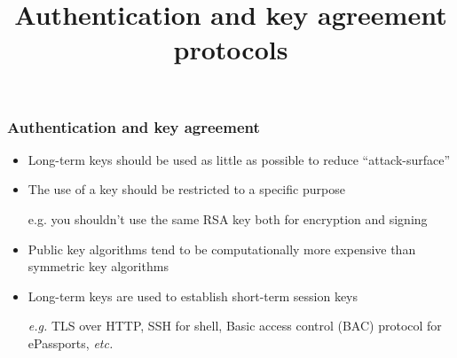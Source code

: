 \documentclass[aspectratio=169, lualatex,  10pt,dvipsnames,svgnames]{beamer} %
\def\envert#1{\textcolor{vert}{#1}}
\def\enrouge#1{\textcolor{rouge}{#1}}
\begin{document}
\fi

\title{Authentication and key agreement protocols}
\author{}
\date{}

\begin{frame}
  \maketitle
\end{frame}

\begin{frame}
  \frametitle{Authentication and key agreement}

  \begin{itemize}
  \item Long-term keys should be used as little as possible to reduce ``attack-surface''
    \medskip{}
  \item The use of a key should be restricted to a specific purpose

    \envert{e.g. you shouldn't use the same RSA key both for encryption and signing}
    \medskip{}

  \item Public key algorithms tend to be computationally more expensive than symmetric key algorithms
    \medskip{}
  \item[\enrouge{$\rightsquigarrow$}] Long-term keys are used to establish short-term \enrouge{session keys}

    \envert{\emph{e.g.} TLS over HTTP, SSH for shell, Basic access control (BAC) protocol for ePassports, \emph{etc.}}
  \end{itemize}
\end{frame}
\end{document}
